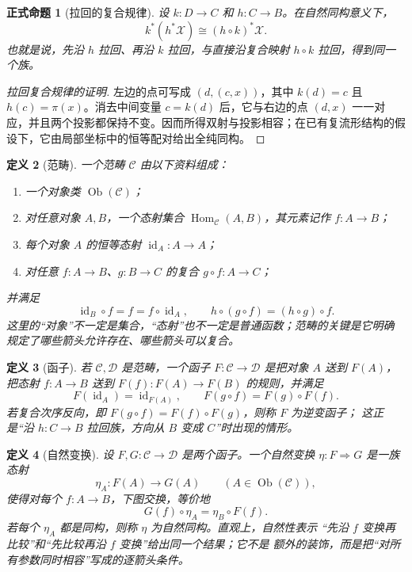 \documentclass[UTF8,fontset=none,a4paper,11pt]{ctexart}
\theoremstyle{foundation-definition}
\newtheorem{definition}{定义}[section]
\theoremstyle{foundation-theorem}
\theoremstyle{foundation-proposition}
\newtheorem{proposition}[definition]{正式命题}
\theoremstyle{foundation-example}
\theoremstyle{foundation-remark}
\theoremstyle{foundation-theorem}
\begin{document}
\begin{proposition}[拉回的复合规律]
设 \(k:D\to C\) 和 \(h:C\to B\)。在自然同构意义下，
\[
k^*(h^*\mathcal X)\cong(h\circ k)^*\mathcal X.
\]
也就是说，先沿 \(h\) 拉回、再沿 \(k\) 拉回，与直接沿复合映射 \(h\circ k\) 拉回，得到同一个族。
\end{proposition}

\begin{proof}[拉回复合规律的证明]
左边的点可写成 \((d,(c,x))\)，其中 \(k(d)=c\) 且 \(h(c)=\pi(x)\)。消去中间变量 \(c=k(d)\) 后，它与右边的点 \((d,x)\) 一一对应，并且两个投影都保持不变。因而所得双射与投影相容；在已有复流形结构的假设下，它由局部坐标中的恒等配对给出全纯同构。
\end{proof}

\begin{definition}[范畴]\label{def:category}
一个范畴 \(\mathcal C\) 由以下资料组成：
\begin{enumerate}[label=(\alph*)]
  \item 一个对象类 \(\operatorname{Ob}(\mathcal C)\)；
  \item 对任意对象 \(A,B\)，一个态射集合
  \(\operatorname{Hom}_{\mathcal C}(A,B)\)，其元素记作 \(f:A\to B\)；
  \item 每个对象 \(A\) 的恒等态射 \(\operatorname{id}_A:A\to A\)；
  \item 对任意 \(f:A\to B\)、\(g:B\to C\) 的复合
  \(g\circ f:A\to C\)；
\end{enumerate}
并满足
\[
\operatorname{id}_B\circ f=f=f\circ\operatorname{id}_A,
\qquad
h\circ(g\circ f)=(h\circ g)\circ f.
\]
这里的“对象”不一定是集合，“态射”也不一定是普通函数；范畴的关键是它明确
规定了哪些箭头允许存在、哪些箭头可以复合。
\end{definition}

\begin{definition}[函子]\label{def:functor}
若 \(\mathcal C,\mathcal D\) 是范畴，一个函子
\(F:\mathcal C\to\mathcal D\) 是把对象 \(A\) 送到 \(F(A)\)，把态射
\(f:A\to B\) 送到 \(F(f):F(A)\to F(B)\) 的规则，并满足
\[
F(\operatorname{id}_A)=\operatorname{id}_{F(A)},\qquad
F(g\circ f)=F(g)\circ F(f).
\]
若复合次序反向，即 \(F(g\circ f)=F(f)\circ F(g)\)，则称 \(F\) 为逆变函子；
这正是“沿 \(h:C\to B\) 拉回族，方向从 \(B\) 变成 \(C\)”时出现的情形。
\end{definition}

\begin{definition}[自然变换]\label{def:natural-transformation}
设 \(F,G:\mathcal C\to\mathcal D\) 是两个函子。一个自然变换
\(\eta:F\Rightarrow G\) 是一族态射
\[
\eta_A:F(A)\longrightarrow G(A)\qquad(A\in\operatorname{Ob}(\mathcal C)),
\]
使得对每个 \(f:A\to B\)，下图交换，等价地
\[
G(f)\circ\eta_A=\eta_B\circ F(f).
\]
若每个 \(\eta_A\) 都是同构，则称 \(\eta\) 为自然同构。直观上，自然性表示
“先沿 \(f\) 变换再比较”和“先比较再沿 \(f\) 变换”给出同一个结果；它不是
额外的装饰，而是把“对所有参数同时相容”写成的逐箭头条件。
\end{definition}
\end{document}
